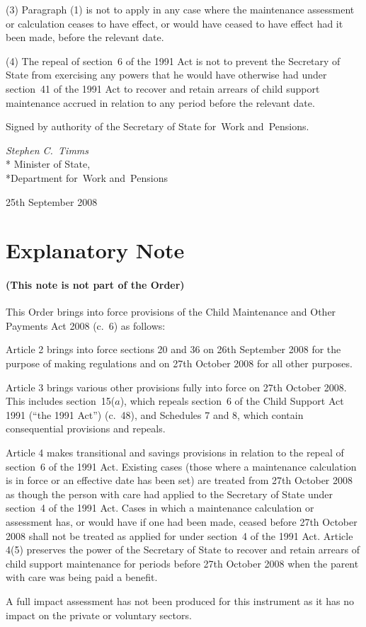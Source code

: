 \documentclass[12pt,a4paper]{article}
\begin{document}
(3) Paragraph (1) is not to apply in any case where the maintenance assessment or calculation ceases to have effect, or would have ceased to have effect had it been made, before the relevant date.

(4) The repeal of section~6 of the 1991 Act is not to prevent the Secretary of State from exercising any powers that he would have otherwise had under section~41 of the 1991 Act to recover and retain arrears of child support maintenance accrued in relation to any period before the relevant date. 

\bigskip

Signed 
by authority of the 
Secretary of State for~Work and~Pensions.

{\raggedleft
\emph{Stephen C.~Timms}\\*
Minister
of State,\\*Department for~Work and~Pensions

}

25th September 2008

\small

\part{Explanatory Note}

\renewcommand\parthead{— Explanatory Note}

\subsection*{(This note is not part of the Order)}

This Order brings into force provisions of the Child Maintenance and Other Payments Act 2008 (c.~6) as follows:

Article 2 brings into force sections 20 and 36 on 26th September 2008 for the purpose of making regulations and on 27th October 2008 for all other purposes.

Article 3 brings various other provisions fully into force on 27th October 2008. This includes section~15($a$), which repeals section~6 of the Child Support Act 1991 (“the 1991 Act”) (c.~48), and Schedules 7 and 8, which contain consequential provisions and repeals.

Article 4 makes transitional and savings provisions in relation to the repeal of section~6 of the 1991 Act. Existing cases (those where a maintenance calculation is in force or an effective date has been set) are treated from 27th October 2008 as though the person with care had applied to the Secretary of State under section~4 of the 1991 Act. Cases in which a maintenance calculation or assessment has, or would have if one had been made, ceased before 27th October 2008 shall not be treated as applied for under section~4 of the 1991 Act. Article 4(5) preserves the power of the Secretary of State to recover and retain arrears of child support maintenance for periods before 27th October 2008 when the parent with care was being paid a benefit.

A full impact assessment has not been produced for this instrument as it has no impact on the private or voluntary sectors. 
\end{document}
